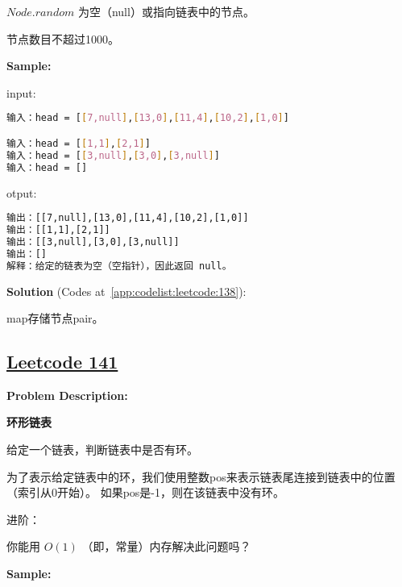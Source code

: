 $ Node.random $ 为空（null）或指向链表中的节点。\par

节点数目不超过1000。\par


\textbf{Sample:}\par

input:\par

\begin{lstlisting}[language=bash]
输入：head = [[7,null],[13,0],[11,4],[10,2],[1,0]]

输入：head = [[1,1],[2,1]]
输入：head = [[3,null],[3,0],[3,null]]
输入：head = []
\end{lstlisting}

otput:\par

\begin{lstlisting}[language=bash]
输出：[[7,null],[13,0],[11,4],[10,2],[1,0]]
输出：[[1,1],[2,1]]
输出：[[3,null],[3,0],[3,null]]
输出：[]
解释：给定的链表为空（空指针），因此返回 null。
\end{lstlisting}

\textbf{Solution }(Codes at~\ref{app:codelist:leetcode:138}):\par

map存储节点pair。\par



\subsection{\href{https://leetcode-cn.com/}{Leetcode 141}}\label{app:problemlist:leetcode:141}

\textbf{Problem Description:}\par

\textbf{环形链表}\par

给定一个链表，判断链表中是否有环。\par

为了表示给定链表中的环，我们使用整数pos来表示链表尾连接到链表中的位置（索引从0开始）。
如果pos是-1，则在该链表中没有环。\par

进阶：\par

你能用 $ O(1) $ （即，常量）内存解决此问题吗？\par


\textbf{Sample:}\par

